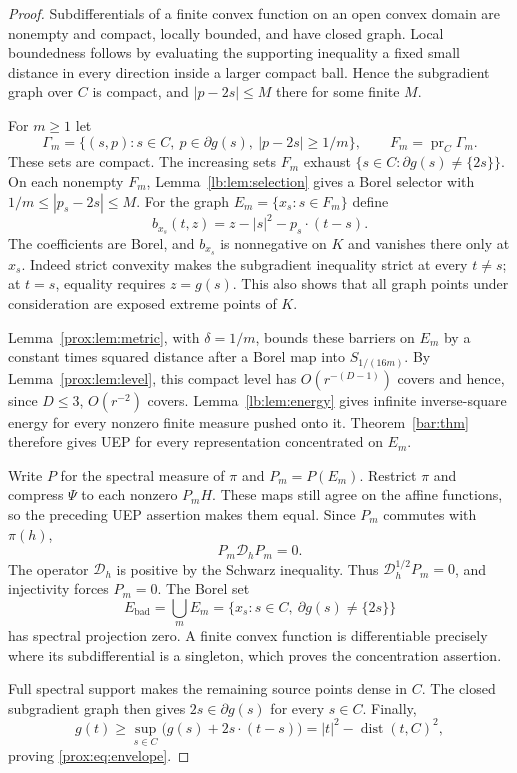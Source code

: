 \documentclass[11pt,letterpaper]{amsart}
\theoremstyle{definition}
\theoremstyle{remark}
\numberwithin{equation}{section}
\DeclareMathOperator{\dist}{dist}
\begin{document}
\begin{proof}
Subdifferentials of a finite convex function on an open convex
domain are nonempty and compact, locally bounded, and have closed
graph. Local boundedness follows by evaluating the supporting
inequality a fixed small distance in every direction inside a
larger compact ball. Hence the subgradient graph over $C$ is
compact, and $|p-2s|\le M$ there for some finite $M$.

For $m\ge1$ let
\[
 \Gamma_m=\{(s,p):s\in C,\ p\in\partial g(s),\
                    |p-2s|\ge1/m\},\qquad
 F_m=\operatorname{pr}_C\Gamma_m.
\]
These sets are compact. The increasing sets $F_m$ exhaust
$\{s\in C:\partial g(s)\ne\{2s\}\}$.
On each nonempty $F_m$, Lemma~\ref{lb:lem:selection} gives a
Borel selector with $1/m\le|p_s-2s|\le M$.
For the graph $E_m=\{x_s:s\in F_m\}$ define
\[
 b_{x_s}(t,z)=z-|s|^2-p_s\cdot(t-s).
\]
The coefficients are Borel, and $b_{x_s}$ is nonnegative on $K$
and vanishes there only at $x_s$. Indeed strict convexity makes
the subgradient inequality strict at every $t\ne s$; at $t=s$,
equality requires $z=g(s)$. This also shows that all graph points
under consideration are exposed extreme points of $K$.

Lemma~\ref{prox:lem:metric}, with $\delta=1/m$, bounds these
barriers on $E_m$ by a constant times squared distance after a
Borel map into $S_{1/(16m)}$. By Lemma~\ref{prox:lem:level}, this
compact level has $O(r^{-(D-1)})$ covers and hence, since $D\le3$,
$O(r^{-2})$ covers. Lemma~\ref{lb:lem:energy} gives infinite
inverse-square energy for every nonzero finite measure pushed
onto it. Theorem~\ref{bar:thm} therefore gives UEP for every
representation concentrated on $E_m$.

Write $P$ for the spectral measure of $\pi$ and $P_m=P(E_m)$.
Restrict $\pi$ and compress $\Psi$ to each nonzero $P_mH$.
These maps still agree on the affine functions, so the preceding
UEP assertion makes them equal. Since $P_m$ commutes with
$\pi(h)$,
\[
 P_m\mathcal D_hP_m=0.
\]
The operator $\mathcal D_h$ is positive by the Schwarz inequality.
Thus $\mathcal D_h^{1/2}P_m=0$, and injectivity forces $P_m=0$.
The Borel set
\[
 E_{\mathrm{bad}}=\bigcup_mE_m
 =\{x_s:s\in C,\ \partial g(s)\ne\{2s\}\}
\]
has spectral projection zero. A finite convex function is
differentiable precisely where its subdifferential is a singleton,
which proves the concentration assertion.

Full spectral support makes the remaining source points dense
in $C$. The closed subgradient graph then gives
$2s\in\partial g(s)$ for every $s\in C$. Finally,
\[
 g(t)\ge\sup_{s\in C}
       \bigl(g(s)+2s\cdot(t-s)\bigr)
       =|t|^2-\dist(t,C)^2,
\]
proving \eqref{prox:eq:envelope}.
\end{proof}
\end{document}

